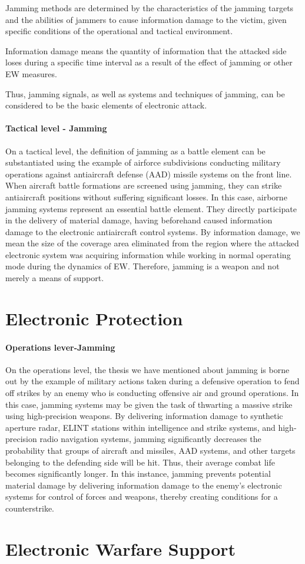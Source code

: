 \documentclass[palatino,english,purist]{ist-report}
\begin{document}
Jamming methods are determined by the characteristics of the jamming
targets and the abilities of jammers to cause information damage to the victim, given specific conditions of the operational and tactical environment. 

Information damage means the quantity of information that the attacked side loses during a specific time interval as a result of the effect of jamming or other EW measures. 

Thus, jamming signals, as well as systems and techniques of jamming,
can be considered to be the basic elements of electronic attack.


\subsection{Tactical level - Jamming}

On a tactical level, the definition of jamming as a battle element can be substantiated using the example of airforce subdivisions conducting military operations against antiaircraft defense (AAD) missile systems on the front line. When aircraft battle formations are screened using jamming, they can strike antiaircraft positions without suffering significant losses. In this case, airborne jamming systems represent an essential battle element. They directly participate in the delivery of material damage, having beforehand caused information damage to the electronic antiaircraft control systems.
By information damage, we mean the size of the coverage area eliminated from the region where the attacked electronic system was acquiring information while working in normal operating mode during the dynamics of EW. Therefore, jamming is a weapon and not merely a
means of support. 




\part{Electronic Protection}

\subsection{Operations lever-Jamming}
On the operations level, the thesis we have mentioned about jamming
is borne out by the example of military actions taken during a defensive operation to fend off strikes by an enemy who is conducting offensive air and ground operations. In this case, jamming systems may be given the task of thwarting a massive strike using high-precision weapons. By delivering information damage to synthetic aperture radar, ELINT stations within intelligence and strike systems, and high-precision radio navigation systems, jamming significantly decreases the probability that groups of aircraft and
missiles, AAD systems, and other targets belonging to the defending side will be hit. Thus, their average combat life becomes significantly longer. In this instance, jamming prevents potential material damage by delivering information damage to the enemy's electronic systems for control of forces and weapons, thereby creating conditions for a counterstrike. 

\part{Electronic Warfare Support}

\pagebreak

\printbibliography
\end{document}
